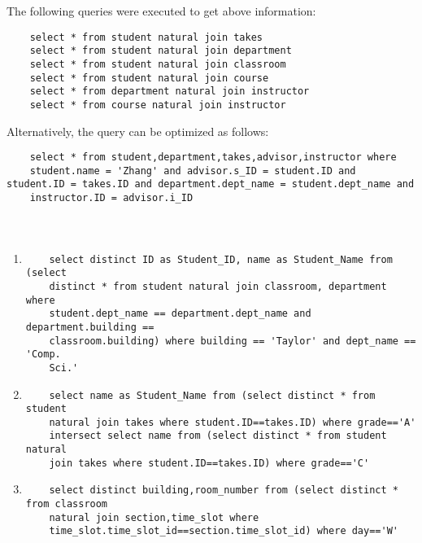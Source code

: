 \documentclass[12pt]{article}
\begin{document}
The following queries were executed to get above information: \\
\begin{verbatim}
    select * from student natural join takes
    select * from student natural join department
    select * from student natural join classroom
    select * from student natural join course
    select * from department natural join instructor
    select * from course natural join instructor
\end{verbatim}

Alternatively, the query can be optimized as follows:
\begin{verbatim}
    select * from student,department,takes,advisor,instructor where
    student.name = 'Zhang' and advisor.s_ID = student.ID and student.ID = takes.ID and department.dept_name = student.dept_name and
    instructor.ID = advisor.i_ID
    
\end{verbatim}
\section{}

\section{}
\begin{enumerate}[label=(\alph*)]
    \item 
        \begin{verbatim}
    select distinct ID as Student_ID, name as Student_Name from (select
    distinct * from student natural join classroom, department where
    student.dept_name == department.dept_name and department.building ==
    classroom.building) where building == 'Taylor' and dept_name == 'Comp.
    Sci.'
        \end{verbatim}
    \item 
        \begin{verbatim}
    select name as Student_Name from (select distinct * from student
    natural join takes where student.ID==takes.ID) where grade=='A'
    intersect select name from (select distinct * from student natural
    join takes where student.ID==takes.ID) where grade=='C'
        \end{verbatim}
        
    \item
        \begin{verbatim}
    select distinct building,room_number from (select distinct * from classroom
    natural join section,time_slot where
    time_slot.time_slot_id==section.time_slot_id) where day=='W'
        \end{verbatim}
\end{enumerate}

        



\end{document}
